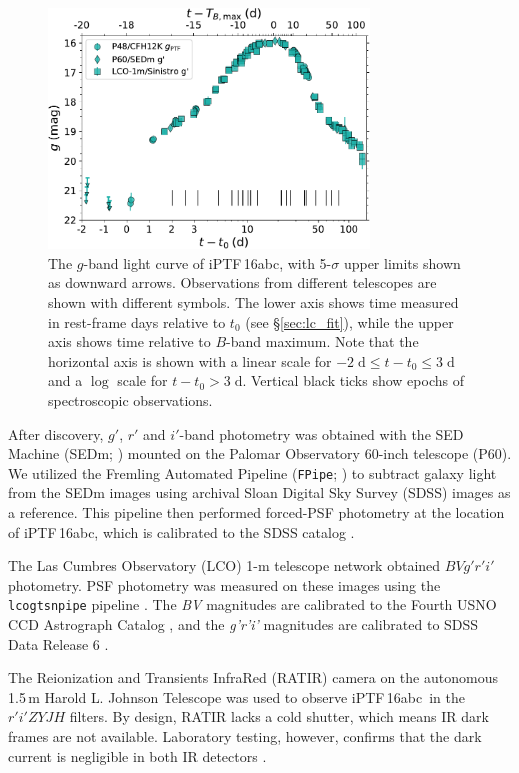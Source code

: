 \documentclass[twocolumn]{aastex61}
\newcommand{\abc}{iPTF\,16abc}
\begin{document}
\begin{figure}[htb] 
    \centering
    \includegraphics[width=3.35in]{logLC_with_colors.pdf} 
    \caption{
    The $g$-band light curve of \abc, with 5-$\sigma$ upper limits shown as
    downward arrows. Observations from different telescopes are shown with
    different symbols. The lower axis shows time measured in
    rest-frame days relative to $t_0$ (see \S\ref{sec:lc_fit}), while
    the upper axis shows time relative to $B$-band maximum. Note that the
    horizontal axis is shown with a linear scale for $-2 \; \mathrm{d} \le t -
    t_0 \le 3 \; \mathrm{d}$ and a $\log$ scale for $t - t_0 > 3 \;
    \mathrm{d}$. Vertical black ticks show epochs of spectroscopic
    observations. }
% 
    \label{fig:lightcurve} 
\end{figure}

After discovery, $g'$, $r'$ and $i'$-band photometry was obtained
with the SED Machine (SEDm; \citealt{2017arXiv171002917B}) mounted on the
Palomar Observatory 60-inch telescope (P60). We utilized the Fremling
Automated Pipeline (\texttt{FPipe}; \citealt{2016A&A...593A..68F}) to subtract
galaxy light from the SEDm images using archival Sloan Digital Sky Survey
(SDSS) images as a reference. This pipeline then performed forced-PSF
photometry at the location of \abc, which is calibrated to the SDSS catalog
\citep{2014ApJS..211...17A}.

The Las Cumbres Observatory (LCO) 1-m telescope network obtained
$BVg'r'i'$ photometry. PSF photometry was measured on these images using the
\texttt{lcogtsnpipe} pipeline \citep{2016MNRAS.459.3939V}. The \textit{BV}
magnitudes are calibrated to the Fourth USNO CCD Astrograph Catalog
\citep{2013AJ....145...44Z}, and the \textit{g'r'i'} magnitudes are calibrated
to SDSS Data Release 6 \citep{2008ApJS..175..297A}.

The Reionization and Transients InfraRed (RATIR) camera on the autonomous
1.5\,m Harold L. Johnson Telescope
\citep{2012SPIE.8446E..10B,2012SPIE.8444E..5LW} was used to observe \abc\ in
the $r'i'ZYJH$ filters. By design, RATIR lacks a cold shutter, which means IR
dark frames are not available. Laboratory testing, however, confirms that the
dark current is negligible in both IR detectors \citep{2012SPIE.8453E..1OF}.
\end{document}
